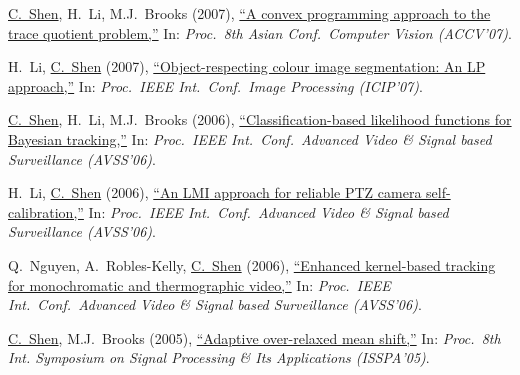 \documentclass[9pt, a4paper]{article}
\newcommand{\years}[1]{\marginnote{\scriptsize #1}}
\def\highlight{\uline}
\begin{document}
\medskip

\years{2007} \highlight{C.~Shen}, H.~Li, M.J.~Brooks (2007),
\href{http://www.google.com/search?lr=&ie=UTF-8&oe=UTF-8&q=A+convex+programming+approach+to+the+trace+quotient+problem+Chunhua+Shen%2C+Hongdong+Li%2C+Michael+J.+Brooks}{``A convex programming approach to the trace quotient problem,{}''}
In: \emph{Proc.\ 8th Asian Conf.\  Computer Vision (ACCV'07)}.

\medskip

\years{2007} H.~Li, \highlight{C.~Shen} (2007),
\href{http://www.google.com/search?lr=&ie=UTF-8&oe=UTF-8&q=Object-respecting+colour+image+segmentation%3A+An+LP+approach+Hongdong+Li%2C+Chunhua+Shen}{``Object-respecting colour image segmentation: An {LP} approach,{}''}
In: \emph{Proc.\ IEEE Int.\ Conf.\  Image Processing (ICIP'07)}.

\medskip

\years{2006} \highlight{C.~Shen}, H.~Li, M.J.~Brooks (2006),
\href{http://www.google.com/search?lr=&ie=UTF-8&oe=UTF-8&q=Classification-based+likelihood+functions+for+Bayesian+tracking+Chunhua+Shen%2C+Hongdong+Li%2C+Michael+J.+Brooks}{``Classification-based likelihood functions for {B}ayesian tracking,{}''}
In: \emph{Proc.\ IEEE Int.\ Conf.\  Advanced Video \& Signal based Surveillance (AVSS'06)}.

\medskip

\years{2006} H.~Li, \highlight{C.~Shen} (2006),
\href{http://www.google.com/search?lr=&ie=UTF-8&oe=UTF-8&q=An+LMI+approach+for+reliable+PTZ+camera+self-calibration+Hongdong+Li%2C+Chunhua+Shen}{``An {LMI} approach for reliable {PTZ} camera self-calibration,{}''}
In: \emph{Proc.\ IEEE Int.\ Conf.\  Advanced Video \& Signal based Surveillance (AVSS'06)}.

\medskip

\years{2006} Q.~Nguyen, A.~Robles-Kelly, \highlight{C.~Shen} (2006),
\href{http://www.google.com/search?lr=&ie=UTF-8&oe=UTF-8&q=Enhanced+kernel-based+tracking+for+monochromatic+and+thermographic+video+Quang+Nguyen%2C+Antonio+Robles-Kelly%2C+Chunhua+Shen}{``Enhanced kernel-based tracking for monochromatic and thermographic video,{}''}
In: \emph{Proc.\ IEEE Int.\ Conf.\  Advanced Video \& Signal based Surveillance (AVSS'06)}.

\medskip

\years{2005} \highlight{C.~Shen}, M.J.~Brooks (2005),
\href{http://www.google.com/search?lr=&ie=UTF-8&oe=UTF-8&q=Adaptive+over-relaxed+mean+shift+Chunhua+Shen%2C+Michael+J.+Brooks}{``Adaptive over-relaxed mean shift,{}''}
In: \emph{Proc.\ 8th Int. Symposium on Signal Processing \& Its Applications (ISSPA'05)}.
\end{document}
